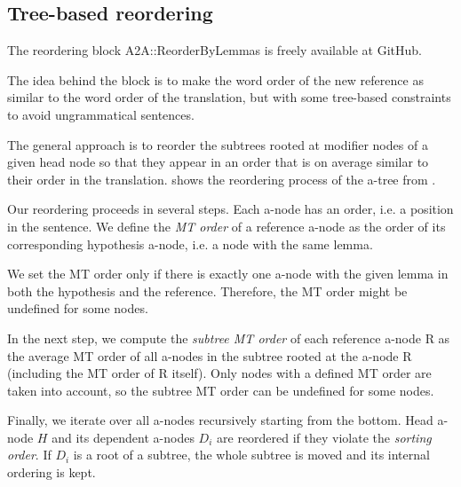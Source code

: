 \subsection{Tree-based reordering}
The reordering block A2A::ReorderByLemmas is freely available at GitHub.

The idea behind the block is to make the word order of the new reference as 
similar to the word order of the translation, but with some tree-based 
constraints to avoid ungrammatical sentences. 

The general approach is to reorder the subtrees rooted at modifier nodes of a 
given head node so that they appear in an order that is on average similar to 
their order in the translation.  shows the reordering process 
of the a-tree from .


Our reordering proceeds in several steps. Each a-node has an order, i.e. a 
position in the sentence.  We define the \emph{MT order} of a reference a-node 
as the order of its corresponding hypothesis a-node, i.e. a node with the same 
lemma. 

We set the MT order only if there is exactly one a-node with the given lemma 
in both the hypothesis and the reference. Therefore, the MT order might be 
undefined for some nodes.

In the next step, we compute the \emph{subtree MT order} of each reference 
a-node R as the average 
MT order of all a-nodes in the subtree rooted at the 
a-node R (including the MT order of R itself). Only nodes with a defined MT 
order are taken into account, so the subtree MT order can be undefined for 
some nodes. 

Finally, we iterate over all a-nodes recursively starting from the bottom. Head 
a-node $H$ and its dependent a-nodes $D_i$ are reordered if they violate the
\emph{sorting order}. If $D_i$ is a root of a subtree, the whole subtree is 
moved and its internal ordering is kept.

